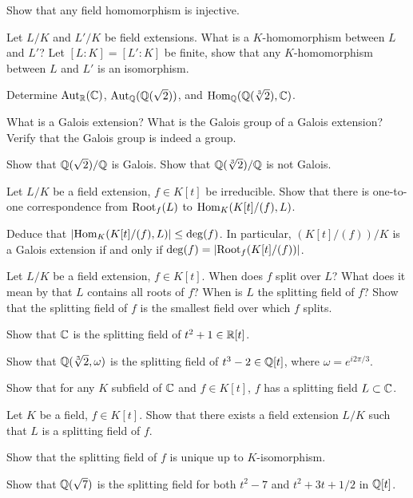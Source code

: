 \begin{question}{8}
    Show that any field homomorphism is injective.
    
    Let $L/K$ and $L'/K$ be field extensions. What is a $K$-homomorphism between $L$ and $L'$? Let $[L:K] = [L':K]$ be finite, show that any $K$-homomorphism between $L$ and $L'$ is an isomorphism.

    Determine $\text{Aut}_{\mathbb{R}}(\mathbb{C})$,  $\text{Aut}_{\mathbb{Q}}(\mathbb{Q}(\sqrt{2}))$, and $\text{Hom}_{\mathbb{Q}}(\mathbb{Q}(\sqrt[3]{2}),\mathbb{C})$.     
\end{question}

\begin{question}{9}
    What is a Galois extension? What is the Galois group of a Galois extension? Verify that the Galois group is indeed a group.

    Show that $\mathbb{Q}(\sqrt{2})/\mathbb{Q}$ is Galois. Show that $\mathbb{Q}(\sqrt[3]{2})/\mathbb{Q}$ is not Galois. 
\end{question}

\begin{question}{10}
    Let $L/K$ be a field extension, $f \in K[t]$ be irreducible. Show that there is one-to-one correspondence from $\text{Root}_f(L)$ to $\text{Hom}_K(K[t]/(f),L)$. 
    
    Deduce that $|\text{Hom}_K(K[t]/(f),L)| \leq \deg(f)$. In particular, $(K[t]/(f))/K $ is a Galois extension if and only if $\deg(f) = |\text{Root}_f(K[t]/(f))|$.
\end{question}

\begin{question}{11}
    Let $L/K$ be a field extension, $f \in K[t]$. When does $f$ split over $L$? What does it mean by that $L$ contains all roots of $f$? When is $L$ the splitting field of $f$? Show that the splitting field of $f$ is the smallest field over which $f$ splits.  

    Show that $\mathbb{C}$ is the splitting field of $t^2 + 1 \in \mathbb{R}[t]$. 

    Show that $\mathbb{Q}(\sqrt[3]{2},\omega)$ is the splitting field of $t^3 - 2 \in \mathbb{Q}[t]$, where $\omega = e^{i2\pi/3}$.

    Show that for any $K$ subfield of $\mathbb{C}$ and $f \in K[t]$, $f$ has a splitting field $L \subset \mathbb{C}$.
\end{question}

\begin{question}{12}
    Let $K$ be a field, $f \in K[t]$. Show that there exists a field extension $L/K$ such that $L$ is a splitting field of $f$.

    Show that the splitting field of $f$ is unique up to $K$-isomorphism.

    Show that $\mathbb{Q}(\sqrt{7})$ is the splitting field for both $t^2-7$ and $t^2 + 3t +1/2$ in $\mathbb{Q}[t]$.
\end{question}

